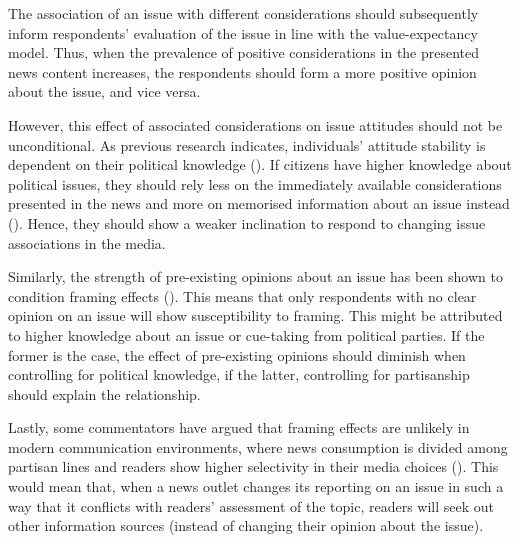 \documentclass{article}
\begin{document}
The association of an issue with different considerations should subsequently inform respondents' evaluation of the issue in line with the value-expectancy model. Thus, when the prevalence of positive considerations in the presented news content increases, the respondents should form a more positive opinion about the issue, and vice versa.

However, this effect of associated considerations on issue attitudes should not be unconditional. As previous research indicates, individuals' attitude stability is dependent on their political knowledge (\cite{Converse1962}). If citizens have higher knowledge about political issues, they should rely less on the immediately available considerations presented in the news and more on memorised information about an issue instead (\cite{Zaller1992}). Hence, they should show a weaker inclination to respond to changing issue associations in the media.

Similarly, the strength of pre-existing opinions about an issue has been shown to condition framing effects (\cite{Bechtel2015, Chong2013}). This means that only respondents with no clear opinion on an issue will show susceptibility to framing. This might be attributed to higher knowledge about an issue or cue-taking from political parties. If the former is the case, the effect of pre-existing opinions should diminish when controlling for political knowledge, if the latter, controlling for partisanship should explain the relationship.

Lastly, some commentators have argued that framing effects are unlikely in modern communication environments, where news consumption is divided among partisan lines and readers show higher selectivity in their media choices (\cite[720]{Bennett2008}). This would mean that, when a news outlet changes its reporting on an issue in such a way that it conflicts with readers' assessment of the topic, readers will seek out other information sources (instead of changing their opinion about the issue).




\end{document}
